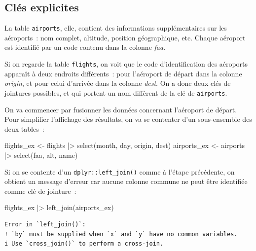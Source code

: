 \documentclass[
  letterpaper,
  DIV=11,
  numbers=noendperiod,
  oneside]{scrreprt}
\newenvironment{Shaded}{\begin{snugshade}}{\end{snugshade}}
\newcommand{\FunctionTok}[1]{\textcolor[rgb]{0.28,0.35,0.67}{#1}}
\newcommand{\NormalTok}[1]{\textcolor[rgb]{0.00,0.23,0.31}{#1}}
\newcommand{\OtherTok}[1]{\textcolor[rgb]{0.00,0.23,0.31}{#1}}
\newcommand{\SpecialCharTok}[1]{\textcolor[rgb]{0.37,0.37,0.37}{#1}}
\begin{document}
\hypertarget{cluxe9s-explicites}{%
\subsection{Clés explicites}\label{cluxe9s-explicites}}

La table \texttt{airports}, elle, contient des informations
supplémentaires sur les aéroports~: nom complet, altitude, position
géographique, etc. Chaque aéroport est identifié par un code contenu
dans la colonne \emph{faa}.

Si on regarde la table \texttt{flights}, on voit que le code
d'identification des aéroports apparaît à deux endroits différents~:
pour l'aéroport de départ dans la colonne \emph{origin}, et pour celui
d'arrivée dans la colonne \emph{dest}. On a donc deux clés de jointures
possibles, et qui portent un nom différent de la clé de
\texttt{airports}.

On va commencer par fusionner les données concernant l'aéroport de
départ. Pour simplifier l'affichage des résultats, on va se contenter
d'un sous-ensemble des deux tables~:

\begin{Shaded}
\begin{Highlighting}[]
\NormalTok{flights\_ex }\OtherTok{\textless{}{-}}\NormalTok{ flights }\SpecialCharTok{|\textgreater{}} \FunctionTok{select}\NormalTok{(month, day, origin, dest)}
\NormalTok{airports\_ex }\OtherTok{\textless{}{-}}\NormalTok{ airports }\SpecialCharTok{|\textgreater{}} \FunctionTok{select}\NormalTok{(faa, alt, name)}
\end{Highlighting}
\end{Shaded}

Si on se contente d'un \texttt{dplyr::left\_join()} comme à l'étape
précédente, on obtient un message d'erreur car aucune colonne commune ne
peut être identifiée comme clé de jointure~:

\begin{Shaded}
\begin{Highlighting}[]
\NormalTok{flights\_ex }\SpecialCharTok{|\textgreater{}} \FunctionTok{left\_join}\NormalTok{(airports\_ex)}
\end{Highlighting}
\end{Shaded}

\begin{verbatim}
Error in `left_join()`:
! `by` must be supplied when `x` and `y` have no common variables.
i Use `cross_join()` to perform a cross-join.
\end{verbatim}
\end{document}
